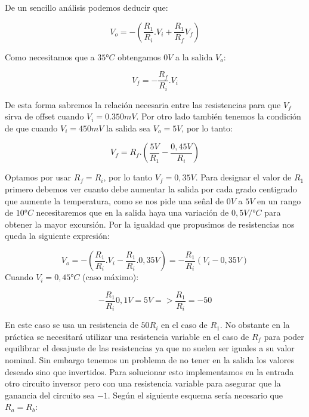 De un sencillo análisis podemos deducir que:

\begin{equation}
    V_o = -(\frac{R_1}{R_i}.V_i + \frac{R_1}{R_f} V_f)
\end{equation}

Como necesitamos que a $35°C$ obtengamos $0V$ a la salida $V_o$:

\begin{equation}
    V_f = -\frac{R_f}{R_i} .V_i
\end{equation}

De esta forma sabremos la relación necesaria entre las resistencias para que $V_f$ sirva de offset cuando $V_i=0.350mV$. Por otro lado también tenemos la condición de que cuando $V_i=450mV$ la salida sea $V_o = 5V$, por lo tanto:

\begin{equation}
    V_f = R_f . (\frac{5V}{R_1} - \frac{0,45V}{R_i})
\end{equation}

Optamos por usar $R_f = R_i$, por lo tanto $V_f=0,35V$. Para designar el valor de $R_1$ primero debemos ver cuanto debe aumentar la salida por cada grado centigrado que aumente la temperatura, como se nos pide una señal de $0V$ a $5V$ en un rango de $10°C$ necesitaremos que en la salida haya una variación de $0,5V/°C$ para obtener la mayor excursión. Por la igualdad que propusimos de resistencias nos queda la siguiente expresión:

\begin{equation}
    V_o = -( \frac{R_1}{R_i} . V_i - \frac{R_1}{R_i}.0,35V ) = -\frac{R_1}{R_i} (V_i-0,35V)
\end{equation}
Cuando $V_i = 0,45°C$ (caso máximo):

\begin{equation}
    -\frac{R_1}{R_i} 0,1V = 5V => \frac{R_1}{R_i}=-50
\end{equation}

En este caso se usa un resistencia de $50R_i$ en el caso de $R_1$. No obstante en la práctica se necesitará utilizar una resistencia variable en el caso de $R_f$ para poder equilibrar el desajuste de las resistencias ya que no suelen ser iguales a su valor nominal.
Sin embargo tenemos un problema de no tener en la salida los valores deseado sino que invertidos. Para solucionar esto implementamos en la entrada otro circuito inversor pero con una resistencia variable para asegurar que la ganancia del circuito sea $-1$. Según el siguiente esquema sería necesario que $R_a = R_b$:

